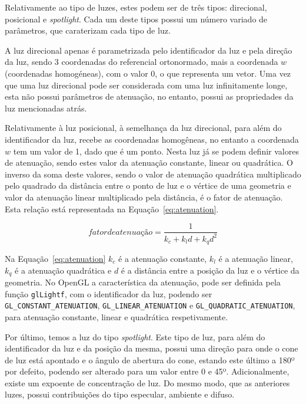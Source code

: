 Relativamente ao tipo de luzes, estes podem ser de três tipos: direcional,
posicional e \emph{spotlight}. Cada um deste tipos possui um número variado de
parâmetros, que caraterizam cada tipo de luz. 

A luz direcional apenas é parametrizada pelo identificador da luz e pela direção
da luz, sendo 3 coordenadas do referencial ortonormado, mais a coordenada $w$
(coordenadas homogéneas), com o valor 0, o que representa um vetor. Uma vez que
uma luz direcional pode ser considerada com uma luz infinitamente longe, esta
não possui parâmetros de atenuação, no entanto, possui as propriedades da luz
mencionadas atrás.

Relativamente à luz posicional, à semelhança da luz direcional, para além do
identificador da luz, recebe as coordenadas homogêneas, no entanto a coordenada
$w$ tem um valor de 1, dado que é um ponto. Nesta luz já se podem definir
valores de atenuação, sendo estes valor da atenuação constante, linear ou
quadrática. O inverso da soma deste valores, sendo o valor de atenuação
quadrática multiplicado pelo quadrado da distância entre o ponto de luz
e o vértice de uma geometria e valor da atenuação linear multiplicado pela
distância, é o fator de atenuação. Esta relação está
representada na Equação~\ref{eq:atenuation}.

\begin{equation}
	fator de atenuação = \frac{1}{k_c + k_{l}d + k_{q}d^2}
\label{eq:atenuation}
\end{equation}

Na Equação~\ref{eq:atenuation} $k_c$ é a atenuação constante, $k_l$
é a atenuação linear, $k_q$ é a atenuação quadrática e $d$ é a distância entre
a posição da luz e o vértice da geometria. No OpenGL a característica da
atenuação, pode ser definida pela função \texttt{glLightf}, com o identificador
da luz, podendo ser \texttt{GL\_CONSTANT\_ATENUATION},
\texttt{GL\_LINEAR\_ATENUATION} e \texttt{GL\_QUADRATIC\_ATENUATION}, para
atenuação constante, linear e quadrática respetivamente.

Por último, temos a luz do tipo \emph{spotlight}. Este tipo de luz, para além do
identificador da luz e da posição da mesma, possui uma direção para onde o cone
de luz está apontado e o ângulo de abertura do cone, estando este último a 180º
por defeito, podendo ser alterado para um valor entre 0 e 45º. Adicionalmente,
existe um expoente de concentração de luz. Do mesmo modo, que as anteriores
luzes, possui contribuições do tipo especular, ambiente e difuso.


